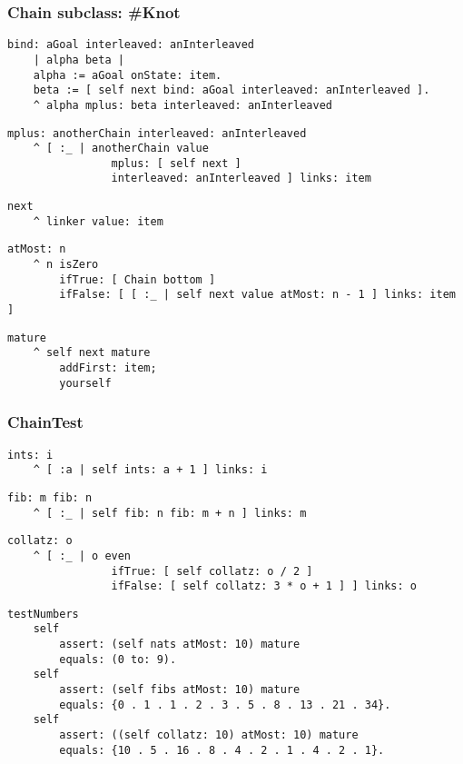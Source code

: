 \documentclass{beamer}
\begin{document}
\begin{frame}[fragile]
\frametitle{Chain subclass: \#Knot}
\begin{verbatim}
bind: aGoal interleaved: anInterleaved
    | alpha beta |
    alpha := aGoal onState: item.
    beta := [ self next bind: aGoal interleaved: anInterleaved ].
    ^ alpha mplus: beta interleaved: anInterleaved
\end{verbatim}
\begin{verbatim}
mplus: anotherChain interleaved: anInterleaved
    ^ [ :_ | anotherChain value
                mplus: [ self next ]
                interleaved: anInterleaved ] links: item
\end{verbatim}
\begin{verbatim}
next
    ^ linker value: item
\end{verbatim}
\begin{verbatim}
atMost: n
    ^ n isZero
        ifTrue: [ Chain bottom ]
        ifFalse: [ [ :_ | self next value atMost: n - 1 ] links: item ]
\end{verbatim}
\begin{verbatim}
mature
    ^ self next mature
        addFirst: item;
        yourself
\end{verbatim}
\end{frame}

\begin{frame}[fragile]
\frametitle{ChainTest}
\begin{verbatim}
ints: i
    ^ [ :a | self ints: a + 1 ] links: i
\end{verbatim}
\begin{verbatim}
fib: m fib: n
    ^ [ :_ | self fib: n fib: m + n ] links: m
\end{verbatim}
\begin{verbatim}
collatz: o
    ^ [ :_ | o even
                ifTrue: [ self collatz: o / 2 ]
                ifFalse: [ self collatz: 3 * o + 1 ] ] links: o
\end{verbatim}
\begin{verbatim}
testNumbers
    self
        assert: (self nats atMost: 10) mature
        equals: (0 to: 9).
    self
        assert: (self fibs atMost: 10) mature
        equals: {0 . 1 . 1 . 2 . 3 . 5 . 8 . 13 . 21 . 34}.
    self
        assert: ((self collatz: 10) atMost: 10) mature
        equals: {10 . 5 . 16 . 8 . 4 . 2 . 1 . 4 . 2 . 1}.
\end{verbatim}
\end{frame}
\end{document}
